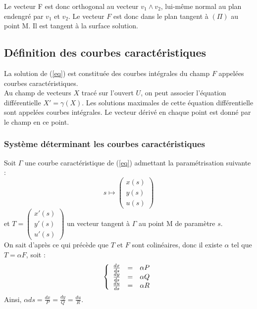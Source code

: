 Le vecteur F est donc orthogonal au vecteur $v_1\wedge v_2$, lui-même normal au plan endengré par $v_1$ et $v_2$. Le vecteur $F$ est donc dans le plan tangent à $(\Pi)$ au point M. Il est tangent à la surface solution.

\subsection{Définition des courbes caractéristiques}
La solution de (\ref{eq}) est constituée des courbes intégrales du champ $F$ appelées courbes caractéristiques. \\
Au champ de vecteurs $X$ tracé sur l'ouvert $U$, on peut associer l'équation différentielle $X'=\gamma(X)$. Les solutions maximales de cette équation différentielle sont appelées courbes intégrales. Le vecteur dérivé en chaque point est donné par le champ en ce point.\\

\subsubsection{Système déterminant les courbes caractéristiques}
Soit $\Gamma$ une courbe caractéristique de (\ref{eq}) admettant la paramétrisation suivante :
	\[s\mapsto \begin{pmatrix} x(s)\\y(s)\\u(s) \end{pmatrix}\]
et $T=\begin{pmatrix} x'(s) \\ y'(s) \\ u'(s) \end{pmatrix}$ un vecteur tangent à $\Gamma$ au point M de paramètre $s$. \\
On sait d'après ce qui précède que $T$ et $F$ sont colinéaires, donc il existe $\alpha$ tel que $T=\alpha F$, soit :
\[\left\{ \begin{array}{c c c}
\frac{dx}{ds}&=&\alpha P \\
\frac{dy}{ds}&=&\alpha Q\\
\frac{du}{ds}&=&\alpha R
\end{array}\right.\]
Ainsi, $\alpha ds = \frac{dx}{P}=\frac{dy}{Q}=\frac{du}{R}$.



